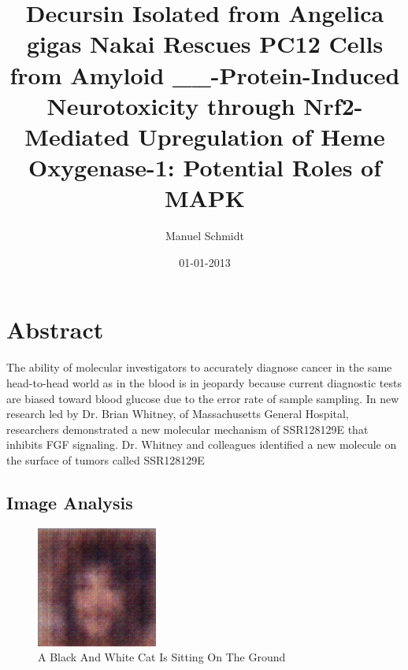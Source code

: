 \documentclass{article}%
\title{Decursin Isolated from Angelica gigas Nakai Rescues PC12 Cells from Amyloid \_\_{-}Protein{-}Induced Neurotoxicity through Nrf2{-}Mediated Upregulation of Heme Oxygenase{-}1: Potential Roles of MAPK}%
\author{Manuel Schmidt}%
\affil{Zhang Zhongjing College of Chinese Medicine, Nanyang Institute of Technology, China}%
\date{01{-}01{-}2013}%
\begin{document}
%
\normalsize%
\maketitle%
\section{Abstract}%
\label{sec:Abstract}%
The ability of molecular investigators to accurately diagnose cancer in the same head{-}to{-}head world as in the blood is in jeopardy because current diagnostic tests are biased toward blood glucose due to the error rate of sample sampling.\newline%
In new research led by Dr. Brian Whitney, of Massachusetts General Hospital, researchers demonstrated a new molecular mechanism of SSR128129E that inhibits FGF signaling. Dr. Whitney and colleagues identified a new molecule on the surface of tumors called SSR128129E

%
\subsection{Image Analysis}%
\label{subsec:ImageAnalysis}%


\begin{figure}[h!]%
\centering%
\includegraphics[width=150px]{500_fake_images/samples_5_284.png}%
\caption{A Black And White Cat Is Sitting On The Ground}%
\end{figure}

%
\end{document}
